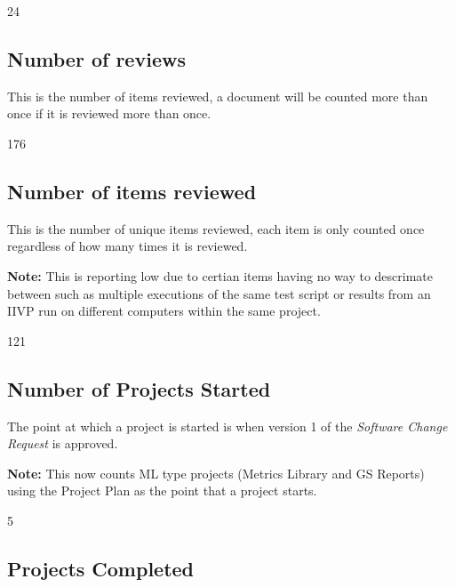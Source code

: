 \documentclass{article}
\begin{document}
\begin{Schunk}
\begin{Soutput}
[1] 24
\end{Soutput}
\end{Schunk}

\subsection{Number of reviews}
This is the number of items reviewed, a document will be counted more than once
if it is reviewed more than once.

\begin{Schunk}
\begin{Soutput}
[1] 176
\end{Soutput}
\end{Schunk}

\subsection{Number of items reviewed}
This is the number of unique items reviewed, each item is only counted once
regardless of how many times it is reviewed.

\textbf{Note:} This is reporting low due to certian items having no way to
descrimate between such as multiple executions of the same test script or
results from an IIVP run on different computers within the same project.

\begin{Schunk}
\begin{Soutput}
[1] 121
\end{Soutput}
\end{Schunk}

\subsection{Number of Projects Started}
The point at which a project is started is when version 1 of the \textit{Software
Change Request} is approved.

\textbf{Note:} This now counts ML type projects (Metrics Library and GS Reports)
using the Project Plan as the point that a project starts.

\begin{Schunk}
\begin{Soutput}
[1] 5
\end{Soutput}
\end{Schunk}

\subsection{Projects Completed}
\end{document}
